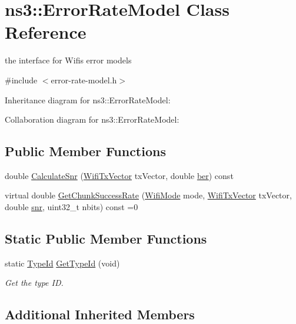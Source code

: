 \hypertarget{classns3_1_1ErrorRateModel}{}\section{ns3\+:\+:Error\+Rate\+Model Class Reference}
\label{classns3_1_1ErrorRateModel}


the interface for Wifi\textquotesingle{}s error models  




{\ttfamily \#include $<$error-\/rate-\/model.\+h$>$}



Inheritance diagram for ns3\+:\+:Error\+Rate\+Model\+:


Collaboration diagram for ns3\+:\+:Error\+Rate\+Model\+:
\subsection*{Public Member Functions}
\begin{DoxyCompactItemize}
\item 
double \hyperlink{classns3_1_1ErrorRateModel_af52cfcaec5a3da44df8517bb7bb71cad}{Calculate\+Snr} (\hyperlink{classns3_1_1WifiTxVector}{Wifi\+Tx\+Vector} tx\+Vector, double \hyperlink{lte__ue__measurements_8m_a8320b665cd9f5639cb929c78d5a41af7}{ber}) const 
\item 
virtual double \hyperlink{classns3_1_1ErrorRateModel_a7cb1aac92893c17de908eaad7c8ef989}{Get\+Chunk\+Success\+Rate} (\hyperlink{classns3_1_1WifiMode}{Wifi\+Mode} mode, \hyperlink{classns3_1_1WifiTxVector}{Wifi\+Tx\+Vector} tx\+Vector, double \hyperlink{lte__pathloss_8m_ae6e82a215dff6b79fb6e9952a1b78453}{snr}, uint32\+\_\+t nbits) const =0
\end{DoxyCompactItemize}
\subsection*{Static Public Member Functions}
\begin{DoxyCompactItemize}
\item 
static \hyperlink{classns3_1_1TypeId}{Type\+Id} \hyperlink{classns3_1_1ErrorRateModel_adc42c625045c25aafbe4d6b3f829c3fe}{Get\+Type\+Id} (void)
\begin{DoxyCompactList}\small\item\em Get the type ID. \end{DoxyCompactList}\end{DoxyCompactItemize}
\subsection*{Additional Inherited Members}


